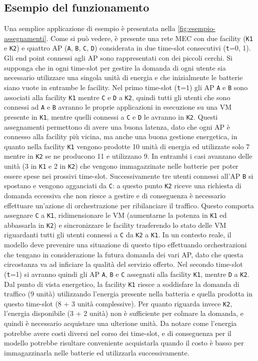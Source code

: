 %
%
\subsection{Esempio del funzionamento}
\label{sub-sec:esempio-funzionamento}

Una semplice applicazione di esempio è presentata nella \autoref{fig:esempio-assegnamenti}. Come si può vedere, è presente una rete MEC con due facility (\texttt{K1} e \texttt{K2}) e quattro AP (\texttt{A}, \texttt{B}, \texttt{C}, \texttt{D}) considerata in due time-slot consecutivi (\texttt{t}=0, 1). Gli end point connessi agli AP sono rappresentati con dei piccoli cerchi. Si supponga che in ogni time-slot per gestire la domanda di ogni utente sia necessario utilizzare una singola unità di energia e che inizialmente le batterie siano vuote in entrambe le facility. Nel primo time-slot (\texttt{t}=1) gli AP \texttt{A} e \texttt{B} sono associati alla facility \texttt{K1} mentre \texttt{C} e \texttt{D} a \texttt{K2}, quindi tutti gli utenti che sono connessi ad \texttt{A} e \texttt{B} avranno le proprie applicazioni in esecuzione su una VM presente in \texttt{K1}, mentre quelli connessi a \texttt{C} e \texttt{D} le avranno in \texttt{K2}. Questi assegnamenti permettono di avere una buona latenza, dato che ogni AP è connesso alla facility più vicina, ma anche una buona gestione energetica, in quanto nella facility \texttt{K1} vengono prodotte 10 unità di energia ed utilizzate solo 7 mentre in \texttt{K2} se ne producono 11 e utilizzano 9. In entrambi i casi avanzano delle unità (3 in \texttt{K1} e 2 in \texttt{K2}) che vengono immagazzinate nelle batterie per poter essere spese nei prossivi time-slot. Successivamente tre utenti connessi all'AP \texttt{B} si spostano e vengono agganciati da \texttt{C}: a questo punto \texttt{K2} riceve una richiesta di domanda eccessiva che non riesce a gestire e di conseguenza è necessario effettuare un'azione di orchestrazione per ribilanciare il traffico. Questo comporta assegnare \texttt{C} a \texttt{K1}, ridimensionare le VM (aumentarne la potenza in \texttt{K1} ed abbassarla in \texttt{K2}) e sincronizzare le facility trasferendo lo stato delle VM riguardanti tutti gli utenti connessi a \texttt{C} da \texttt{K2} a \texttt{K1}. In un contesto reale, il modello deve prevenire una situazione di questo tipo effettuando orchestrazioni che tengano in considerazione la futura domanda dei vari AP, dato che questa circostanza va ad inficiare la qualità del servizio offerto. Nel secondo time-slot (\texttt{t}=1) si avranno quindi gli AP \texttt{A}, \texttt{B} e \texttt{C} assegnati alla facility \texttt{K1}, mentre \texttt{D} a \texttt{K2}. Dal punto di vista energetico, la facility \texttt{K1} riesce a soddisfare la domanda di traffico (9 unità) utilizzando l'energia presente nella batteria e quella prodotta in questo time-slot (8 + 3 unità complessive). Per quanto riguarda invece \texttt{K2}, l'energia disponibile (3 + 2 unità) non è sufficiente per colmare la domanda, e quindi è necessario acquistare una ulterione unità. Da notare come l'energia potrebbe avere costi diversi nel corso dei time-slot, e di conseguenza per il modello potrebbe risultare conveniente acquistarla quando il costo è basso per immagazzinarla nelle batterie ed utilizzarla successivamente.


